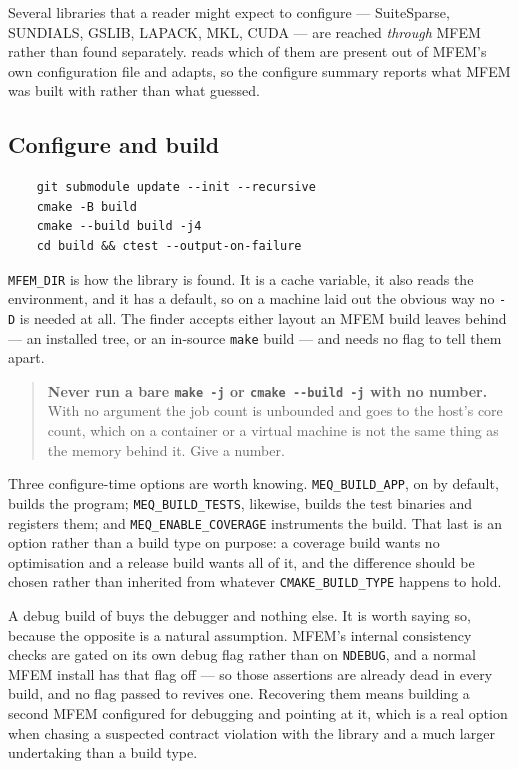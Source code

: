 Several libraries that a reader might expect to configure --- SuiteSparse,
SUNDIALS, GSLIB, LAPACK, MKL, CUDA --- are reached \emph{through} MFEM rather
than found separately. {\meq} reads which of them are present out of MFEM's own
configuration file and adapts, so the configure summary reports what MFEM was
built with rather than what {\meq} guessed.

\subsection{Configure and build}

\begin{verbatim}
    git submodule update --init --recursive
    cmake -B build
    cmake --build build -j4
    cd build && ctest --output-on-failure
\end{verbatim}

\texttt{MFEM\_DIR} is how the library is found. It is a cache variable, it also
reads the environment, and it has a default, so on a machine laid out the
obvious way no \texttt{-D} is needed at all. The finder accepts either layout an
MFEM build leaves behind --- an installed tree, or an in-source \texttt{make}
build --- and needs no flag to tell them apart.

\begin{quote}
	\textbf{Never run a bare \texttt{make -j} or \texttt{cmake -{}-build -j}
	with no number.} With no argument the job count is unbounded and goes to
	the host's core count, which on a container or a virtual machine is not the
	same thing as the memory behind it. Give a number.
\end{quote}

Three configure-time options are worth knowing. \texttt{MEQ\_BUILD\_APP}, on by
default, builds the program; \texttt{MEQ\_BUILD\_TESTS}, likewise, builds the
test binaries and registers them; and \texttt{MEQ\_ENABLE\_COVERAGE}
instruments the build. That last is an option rather than a build type on
purpose: a coverage build wants no optimisation and a release build wants all of
it, and the difference should be chosen rather than inherited from whatever
\texttt{CMAKE\_BUILD\_TYPE} happens to hold.

A debug build of {\meq} buys the debugger and nothing else. It is worth saying
so, because the opposite is a natural assumption. MFEM's internal consistency
checks are gated on its own debug flag rather than on \texttt{NDEBUG}, and a
normal MFEM install has that flag off --- so those assertions are already dead
in every {\meq} build, and no flag passed to {\meq} revives one. Recovering them
means building a second MFEM configured for debugging and pointing at it, which
is a real option when chasing a suspected contract violation with the library
and a much larger undertaking than a build type.

